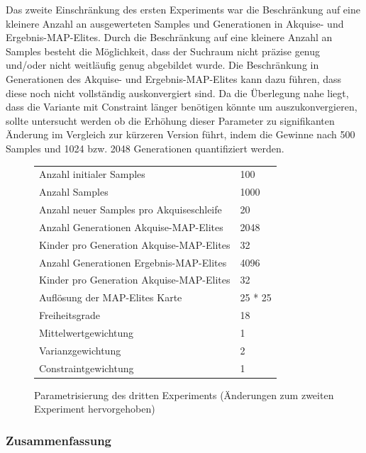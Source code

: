Das zweite Einschränkung des ersten Experiments war die Beschränkung auf eine kleinere Anzahl an ausgewerteten Samples und Generationen in Akquise- und Ergebnis-MAP-Elites.
Durch die Beschränkung auf eine kleinere Anzahl an Samples besteht die Möglichkeit, dass der Suchraum nicht präzise genug und/oder nicht weitläufig genug abgebildet wurde.
Die Beschränkung in Generationen des Akquise- und Ergebnis-MAP-Elites kann dazu führen, dass diese noch nicht vollständig auskonvergiert sind.
Da die Überlegung nahe liegt, dass die Variante mit Constraint länger benötigen könnte um auszukonvergieren, sollte untersucht werden ob die Erhöhung dieser Parameter zu signifikanten Änderung im Vergleich zur kürzeren Version führt, indem die Gewinne nach 500 Samples und 1024 bzw. 2048 Generationen quantifiziert werden.

\begin{figure}[h]
	\centering
	\begin{tabularx}{.75\textwidth}{ll}\hline
		Anzahl initialer Samples & 100 \\
		Anzahl Samples & 1000 \\
		Anzahl neuer Samples pro Akquiseschleife & 20 \\
		Anzahl Generationen Akquise-MAP-Elites & 2048 \\
		Kinder pro Generation Akquise-MAP-Elites & 32 \\
		Anzahl Generationen Ergebnis-MAP-Elites & 4096 \\
		Kinder pro Generation Akquise-MAP-Elites & 32 \\
		Auflösung der MAP-Elites Karte & 25 * 25  \\
		\hline
		Freiheitsgrade & 18 \\
		Mittelwertgewichtung & 1 \\
		Varianzgewichtung & 2 \\
		Constraintgewichtung & 1 \\
	\end{tabularx}
	\label{tab:params3rd}
	\caption{Parametrisierung des dritten Experiments (Änderungen zum zweiten Experiment hervorgehoben)}
\end{figure}

\subsubsection{Zusammenfassung}




